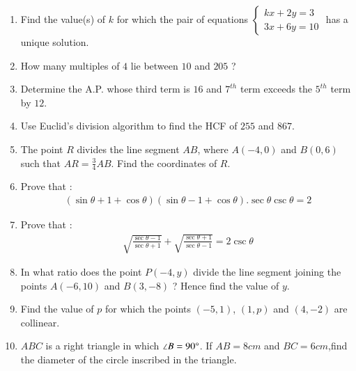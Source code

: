 \documentclass[12pt,-letter paper]{article}
\providecommand{\brak}[1]{\ensuremath{\left(#1\right)}}
\begin{document}
\begin{enumerate}
 \item Find the value(s) of $k$ for which the pair of equations 
 $\begin{cases}
 kx+2y=3\\
 3x+6y=10
 \end{cases} $
has a unique solution.

\item How many multiples of $4$ lie between $10$ and $205$ ?

\item Determine the A.P. whose third term is $16$ and $7^{th}$ term exceeds the $5^{th}$ term by $12$.

\item Use Euclid's division algorithm to find the HCF of $255$ and $867$.

\item The point $R$ divides the line segment $AB$, where $A\brak{- 4, 0}$ and $B\brak{0,6}$ such that $AR=\frac{3}{4} AB$. Find the coordinates of $R$.

\item Prove that :
\begin{align*}
    \brak{\sin \theta+1+\cos \theta} \brak{\sin\theta-1+\cos\theta}.\sec\theta \csc\theta=2
\end{align*}

\item Prove that :
\begin{align*}
      \sqrt{\frac{\sec\theta-1}{\sec\theta+1}} + \sqrt{\frac{\sec\theta+1}{\sec\theta-1}} = 2\csc\theta
\end{align*}
\item In what ratio does the point $P\brak{- 4, y}$ divide the line segment joining the points $A\brak{- 6, 10}$ and $B\brak{3, - 8}$ ? Hence find the value of $y$.

\item Find the value of $p$ for which the points $\brak{-5, 1}$, $\brak{1, p}$ and $\brak{4, -2}$ are collinear.

\item $ABC$ is a right triangle in which $\angle B = 90\degree$. If $AB = 8 cm$ and $BC = 6 cm$,find the diameter of the circle inscribed in the triangle.


\end{enumerate}
\end{document}
